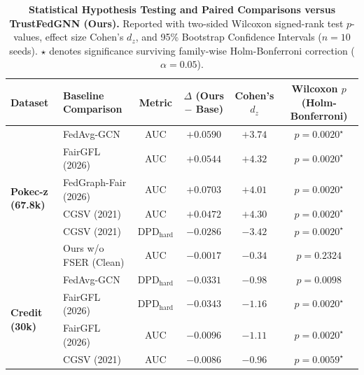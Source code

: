 \begin{table}[t]
\centering
\small
\caption{\textbf{Statistical Hypothesis Testing and Paired Comparisons versus TrustFedGNN (Ours).}
Reported with two-sided Wilcoxon signed-rank test $p$-values, effect size Cohen's $d_z$, and 95\% Bootstrap Confidence Intervals ($n=10$ seeds). $\star$ denotes significance surviving family-wise Holm-Bonferroni correction ($\alpha=0.05$).}
\label{tab:statistical_significance}
\begin{tabular}{llcccc}
\toprule
\textbf{Dataset} & \textbf{Baseline Comparison} & \textbf{Metric} & \textbf{$\Delta$ (Ours $-$ Base)} & \textbf{Cohen's $d_z$} & \textbf{Wilcoxon $p$ (Holm-Bonferroni)} \\
\midrule
\multirow{6}{*}{\textbf{Pokec-z (67.8k)}} 
 & FedAvg-GCN & AUC & $+0.0590$ & $+3.74$ & $p = 0.0020^\star$ \\
 & FairGFL (2026) & AUC & $+0.0544$ & $+4.32$ & $p = 0.0020^\star$ \\
 & FedGraph-Fair (2026) & AUC & $+0.0703$ & $+4.01$ & $p = 0.0020^\star$ \\
 & CGSV (2021) & AUC & $+0.0472$ & $+4.30$ & $p = 0.0020^\star$ \\
 & CGSV (2021) & $\text{DPD}_{\text{hard}}$ & $-0.0286$ & $-3.42$ & $p = 0.0020^\star$ \\
 & Ours w/o FSER (Clean) & AUC & $-0.0017$ & $-0.34$ & $p = 0.2324$ \\
\midrule
\multirow{4}{*}{\textbf{Credit (30k)}} 
 & FedAvg-GCN & $\text{DPD}_{\text{hard}}$ & $-0.0331$ & $-0.98$ & $p = 0.0098$ \\
 & FairGFL (2026) & $\text{DPD}_{\text{hard}}$ & $-0.0343$ & $-1.16$ & $p = 0.0020^\star$ \\
 & FairGFL (2026) & AUC & $-0.0096$ & $-1.11$ & $p = 0.0020^\star$ \\
 & CGSV (2021) & AUC & $-0.0086$ & $-0.96$ & $p = 0.0059^\star$ \\
\bottomrule
\end{tabular}
\end{table}
